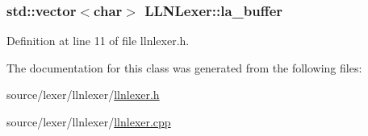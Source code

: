 \hypertarget{class_l_l_n_lexer_a6e583dda9f354ddb453c277be2cb6edc}{
\subsubsection[{la\_\-buffer}]{\setlength{\rightskip}{0pt plus 5cm}std::vector$<$char$>$ {\bf LLNLexer::la\_\-buffer}}}
\label{class_l_l_n_lexer_a6e583dda9f354ddb453c277be2cb6edc}


Definition at line 11 of file llnlexer.h.



The documentation for this class was generated from the following files:\begin{DoxyCompactItemize}
\item 
source/lexer/llnlexer/\hyperlink{llnlexer_8h}{llnlexer.h}\item 
source/lexer/llnlexer/\hyperlink{llnlexer_8cpp}{llnlexer.cpp}\end{DoxyCompactItemize}
